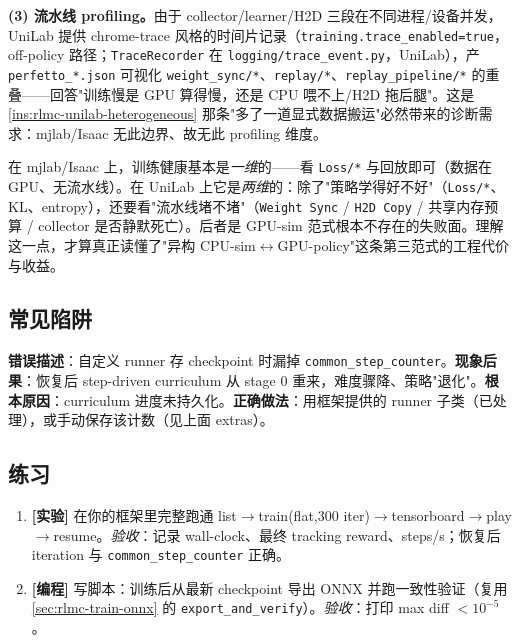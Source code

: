\textbf{(3) 流水线 profiling。}由于 collector/learner/H2D 三段在不同进程/设备并发，UniLab 提供 chrome-trace 风格的时间片记录（\verb|training.trace_enabled=true|，off-policy 路径；\verb|TraceRecorder| 在 \verb|logging/trace_event.py|，UniLab），产 \verb|perfetto_*.json| 可视化 \verb|weight_sync/*|、\verb|replay/*|、\verb|replay_pipeline/*| 的重叠——回答"训练慢是 GPU 算得慢，还是 CPU 喂不上/H2D 拖后腿"。这是 \cref{ins:rlmc-unilab-heterogeneous} 那条"多了一道显式数据搬运"必然带来的诊断需求：mjlab/Isaac 无此边界、故无此 profiling 维度。

\begin{insight}\label{ins:rlmc-unilab-two-axes}
在 mjlab/Isaac 上，训练健康基本是\emph{一维}的——看 \verb|Loss/*| 与回放即可（数据在 GPU、无流水线）。在 UniLab 上它是\emph{两维}的：除了"策略学得好不好"（\verb|Loss/*|、KL、entropy），还要看"流水线堵不堵"（\verb|Weight Sync| / \verb|H2D Copy| / 共享内存预算 / collector 是否静默死亡）。后者是 GPU-sim 范式根本不存在的失败面。理解这一点，才算真正读懂了"异构 CPU-sim$\leftrightarrow$GPU-policy"这条第三范式的工程代价与收益。
\end{insight}

\subsection{常见陷阱}

\begin{pitfall}
\textbf{错误描述}：自定义 runner 存 checkpoint 时漏掉 \verb|common_step_counter|。\textbf{现象后果}：恢复后 step-driven curriculum 从 stage 0 重来，难度骤降、策略"退化"。\textbf{根本原因}：curriculum 进度未持久化。\textbf{正确做法}：用框架提供的 runner 子类（已处理），或手动保存该计数（见上面 extras）。
\end{pitfall}

\subsection{练习}

\begin{practice}[端到端流程]
\begin{enumerate}
  \item \textbf{[实验]} 在你的框架里完整跑通 list$\to$train(flat,300 iter)$\to$tensorboard$\to$play$\to$resume。\emph{验收}：记录 wall-clock、最终 tracking reward、steps/s；恢复后 iteration 与 \verb|common_step_counter| 正确。
  \item \textbf{[编程]} 写脚本：训练后从最新 checkpoint 导出 ONNX 并跑一致性验证（复用 \cref{sec:rlmc-train-onnx} 的 \verb|export_and_verify|）。\emph{验收}：打印 max diff $<10^{-5}$。
\end{enumerate}
\end{practice}

